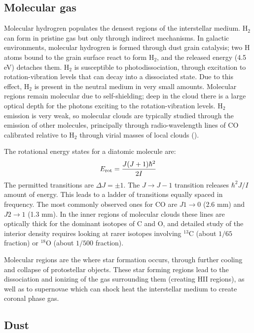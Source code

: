 \subsection{Molecular gas}

Molecular hydrogren populates the densest regions of the interstellar
medium. H$_2$ can form in pristine gas but only through indirect
mechanisms. In galactic environments, molecular hydrogren is formed
through dust grain catalysis; two H atoms bound to the grain surface
react to form H$_2$, and the released energy (4.5 eV) detaches
them. H$_2$ is susceptible to photodissociation, through excitation to
rotation-vibration levels that can decay into a dissociated state. Due
to this effect, H$_2$ is present in the neutral medium in very small
amounts. Molecular regions remain molecular due to self-shielding;
deep in the cloud there is a large optical depth for the photons
exciting to the rotation-vibration levels. H$_2$ emission is very
weak, so molecular clouds are typically studied through the emission
of other molecules, principally through radio-wavelength lines of CO
calibrated relative to H$_2$ through virial masses of local clouds
(\citealt{bolatto13a}).

The rotational energy states for a diatomic molecule are:
\begin{equation}
E_{\rm rot} = \frac{J(J+1) \hbar^2}{2I}
\end{equation}
The permitted transitions are $\Delta J = \pm 1$. The $J\rightarrow
J-1$ transition releases $\hbar^2J/I$ amount of energy. This leads to
a ladder of transitions equally spaced in frequency. The most commonly
observed ones for CO are $J1\rightarrow 0$ (2.6 mm) and $J2\rightarrow
1$ (1.3 mm). In the inner regions of molecular clouds these lines are
optically thick for the dominant isotopes of C and O, and detailed
study of the interior density requires looking at rarer isotopes
involving ${}^{13}$C (about $1/65$ fraction) or ${}^{18}$O (about
$1/500$ fraction).

Molecular regions are the where star formation occurs, through further
cooling and collapse of protostellar objects. These star forming
regions lead to the dissociation and ionizing of the gas surrounding
them (creating HII regions), as well as to supernovae which can shock
heat the interstellar medium to create coronal phase gas.

\subsection{Dust}

